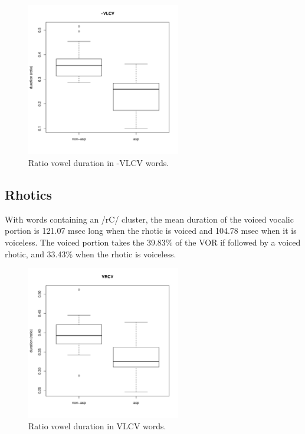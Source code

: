 \documentclass[11pt,a4paper,openany]{memoir}\usepackage[]{graphicx}\usepackage[]{color}
\newenvironment{knitrout}{}{} %
\begin{document}
\begin{figure}
\centering
\begin{knitrout}
\color{fgcolor}
\includegraphics[width=0.6\textwidth]{img/di-lat-box-1} 

\end{knitrout}
\caption{Ratio vowel duration in -VLCV words.}
\label{f:dilat}
\end{figure}

\subsection{Rhotics}



With words containing an /rC/ cluster, the mean duration of the voiced vocalic portion is 121.07 msec long when the rhotic is voiced and 104.78 msec when it is voiceless.
The voiced portion takes the 39.83\% of the VOR if followed by a voiced rhotic, and 33.43\% when the rhotic is voiceless.

\begin{figure}
\centering
\begin{knitrout}
\color{fgcolor}
\includegraphics[width=0.6\textwidth]{img/di-rho-box-1} 

\end{knitrout}
\caption{Ratio vowel duration in VLCV words.}
\label{f:dirho}
\end{figure}
\end{document}
